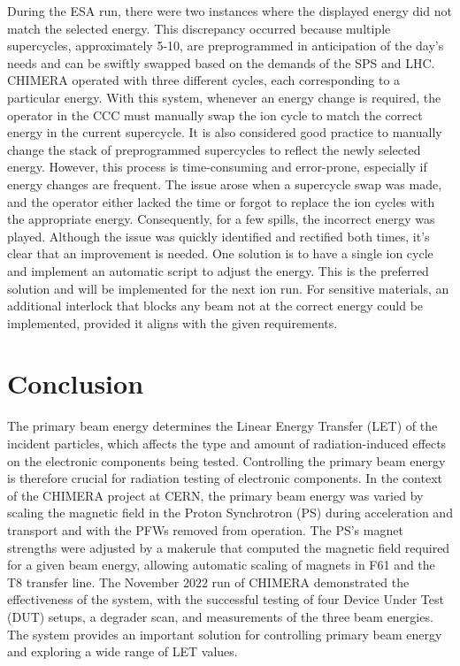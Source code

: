 \documentclass{cernatsnote}
\begin{document}
During the ESA run, there were two instances where the displayed energy did not match the selected energy. This discrepancy occurred because multiple supercycles, approximately 5-10, are preprogrammed in anticipation of the day's needs and can be swiftly swapped based on the demands of the SPS and LHC. CHIMERA operated with three different cycles, each corresponding to a particular energy. With this system, whenever an energy change is required, the operator in the CCC must manually swap the ion cycle to match the correct energy in the current supercycle. It is also considered good practice to manually change the stack of preprogrammed supercycles to reflect the newly selected energy. However, this process is time-consuming and error-prone, especially if energy changes are frequent. The issue arose when a supercycle swap was made, and the operator either lacked the time or forgot to replace the ion cycles with the appropriate energy. Consequently, for a few spills, the incorrect energy was played. Although the issue was quickly identified and rectified both times, it's clear that an improvement is needed. One solution is to have a single ion cycle and implement an automatic script to adjust the energy. This is the preferred solution and will be implemented for the next ion run. For sensitive materials, an additional interlock that blocks any beam not at the correct energy could be implemented, provided it aligns with the given requirements.


\section{Conclusion}

 The primary beam energy determines the Linear Energy Transfer (LET) of the incident particles, which affects the type and amount of radiation-induced effects on the electronic components being tested. Controlling the primary beam energy is therefore crucial for radiation testing of electronic components. In the context of the CHIMERA project at CERN, the primary beam energy was varied by scaling the magnetic field in the Proton Synchrotron (PS) during acceleration and transport and with the PFWs removed from operation. The PS's magnet strengths were adjusted by a makerule that computed the magnetic field required for a given beam energy, allowing automatic scaling of magnets in F61 and the T8 transfer line. The November 2022 run of CHIMERA demonstrated the effectiveness of the system, with the successful testing of four Device Under Test (DUT) setups, a degrader scan, and measurements of the three beam energies. The system provides an important solution for controlling primary beam energy and exploring a wide range of LET values.
\end{document}
